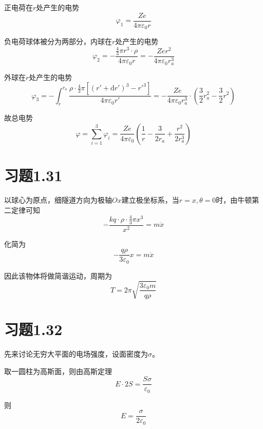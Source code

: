 \documentclass{SCIS2020cn}
\begin{document}
正电荷在$r$处产生的电势
\begin{equation}
    \varphi_1=\frac{Ze}{4\pi\varepsilon_0r}
\end{equation}

负电荷球体被分为两部分，内球在$r$处产生的电势
\begin{equation}
    \varphi_2=-\frac{\frac{4}{3}\pi{}r^3·\rho}{4\pi\varepsilon_0r}=-\frac{Zer^2}{4\pi\varepsilon_0r_a^3}
\end{equation}

外球在$r$处产生的电势
\begin{equation}
    \varphi_3=-\int_r^{r_a}\frac{\rho·\frac{4}{3}\pi\left[(r'+\text{d}r')^3-r'^3\right]}{4\pi\varepsilon_0r'}=-\frac{Ze}{4\pi\varepsilon_0r_a^3}·\left(\frac{3}{2}r_a^2-\frac{3}{2}r^2\right)
\end{equation}

故总电势
\begin{equation}
    \varphi=\sum_{i=1}^3\varphi_i=\frac{Ze}{4\pi\varepsilon_0}\left(\frac{1}{r}-\frac{3}{2r_a}+\frac{r^2}{2r_a^3}\right)
\end{equation}

\section{习题1.31}
以球心为原点，细隧道方向为极轴$Ox$建立极坐标系，当$r=x,\theta=0$时，由牛顿第二定律可知
\begin{equation}
    -\frac{kq·\rho·\frac{4}{3}\pi{}x^3}{x^2}=m\ddot{x}
\end{equation}

化简为
\begin{equation}
    -\frac{q\rho}{3\varepsilon_0}x=m\ddot{x}
\end{equation}

因此该物体将做简谐运动，周期为
\begin{equation}
    T=2\pi\sqrt{\frac{3\varepsilon_0m}{q\rho}}
\end{equation}

\section{习题1.32}
先来讨论无穷大平面的电场强度，设面密度为$\sigma$。

取一圆柱为高斯面，则由高斯定理
\begin{equation}
    E·2S=\frac{S\sigma}{\varepsilon_0}
\end{equation}

则
\begin{equation}
    E=\frac{\sigma}{2\varepsilon_0}
\end{equation}
\end{document}
